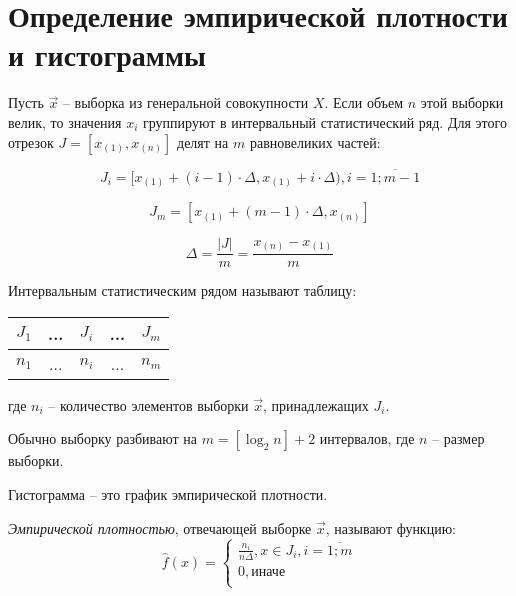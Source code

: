 \section{Определение эмпирической плотности и гистограммы}

Пусть $\vec x$ -- выборка из генеральной совокупности $X$. Если объем $n$ этой выборки велик, то значения $x_i$ группируют в интервальный статистический ряд. Для этого отрезок $J = [x_{(1)}, x_{(n)}]$ делят на $m$ равновеликих частей:

\begin{equation*}
    J_i = [x_{(1)} + (i - 1) \cdot \Delta, x_{(1)} + i \cdot \Delta), i = \overline{1; m - 1}
\end{equation*}

\begin{equation*}
    J_{m} = [x_{(1)} + (m - 1) \cdot \Delta, x_{(n)}]
\end{equation*}

\begin{equation*}
    \Delta = \frac{|J|}{m} = \frac{x_{(n)} - x_{(1)}}{m}
\end{equation*}

Интервальным статистическим рядом называют таблицу:

\begin{table}[htb]
    \centering
    \begin{tabular}{|c|c|c|c|c|}
        \hline
        $J_1$ & ... & $J_i$ & ... & $J_m$ \\
        \hline
        $n_1$ & ... & $n_i$ & ... & $n_m$ \\
        \hline
    \end{tabular}
\end{table}

где $n_i$ -- количество элементов выборки $\vec x$, принадлежащих $J_i$.

Обычно выборку разбивают на $m=[\log_2n]+2$ интервалов, где $n$ -- размер выборки.

Гистограмма -- это график эмпирической плотности. 

\textit{Эмпирической плотностью}, отвечающей выборке $\vec{x}$, называют функцию:
\begin{equation}
    \hat f(x) =
    \begin{cases}
        \frac{n_i}{n \Delta}, x \in J_i, i = \overline{1; m} \\
        0, \text{иначе} \\
    \end{cases}
\end{equation}

